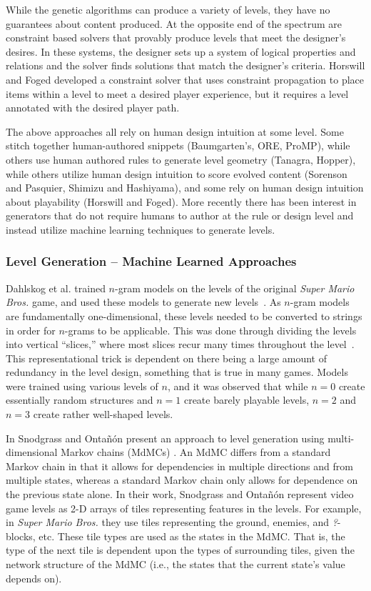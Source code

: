 \documentclass[12pt]{report}
\begin{document}
While the genetic algorithms can produce a variety of levels, they have no guarantees about content produced. At the opposite end of the spectrum are constraint based solvers that provably produce levels that meet the designer's desires. In these systems, the designer sets up a system of logical properties and relations and the solver finds solutions that match the designer's criteria.
Horswill and Foged \cite{HORSWILLCONSTRAINT} developed a constraint solver that uses constraint propagation to place items within a level to meet a desired player experience, but it requires a level annotated with the desired player path. 


The above approaches all rely on human design intuition at some level.  Some stitch together human-authored snippets (Baumgarten's, ORE, ProMP), while others use human authored rules to generate level geometry (Tanagra, Hopper), while others  utilize human design intuition to score evolved content (Sorenson and Pasquier, Shimizu and Hashiyama), and some rely on human design intuition about playability (Horswill and Foged).  More recently there has been interest in generators that do not require humans to author at the rule or design level and instead utilize machine learning techniques to generate levels.
\subsubsection*{Level Generation -- Machine Learned Approaches}

Dahlskog et al. trained $n$-gram models on the levels of the original \textit{Super Mario Bros.} game, and used these models to generate new levels~\cite{dahlskog2014linear}. As $n$-gram models are fundamentally one-dimensional, these levels needed to be converted to strings in order for $n$-grams to be applicable. This was done through dividing the levels into vertical ``slices,'' where most slices recur many times throughout the level~\cite{dahlskog2013patterns}. This representational trick is dependent on there being a large amount of redundancy in the level design, something that is true in many games. Models were trained using various levels of $n$, and it was observed that while $n=0$ create essentially random structures and $n=1$ create barely playable levels, $n=2$ and $n=3$ create rather well-shaped levels.

In \cite{snodgrass2014experiments} Snodgrass and Onta{\~n}{\'o}n present an approach to level generation using multi-dimensional Markov chains (MdMCs) \cite{ching2007multi}. An MdMC differs from a standard Markov chain in that it allows for dependencies in multiple directions and from multiple states, whereas a standard Markov chain only allows for dependence on the previous state alone. In their work, Snodgrass and Onta{\~n}{\'o}n represent video game levels as 2-D arrays of tiles representing features in the levels. For example, in \textit{Super Mario Bros.} they use tiles representing the ground, enemies, and {\em ?}-blocks, etc. These tile types are used as the states in the MdMC. That is, the type of the next tile is dependent upon the types of surrounding tiles, given the network structure of the MdMC (i.e., the states that the current state's value depends on).
\end{document}
